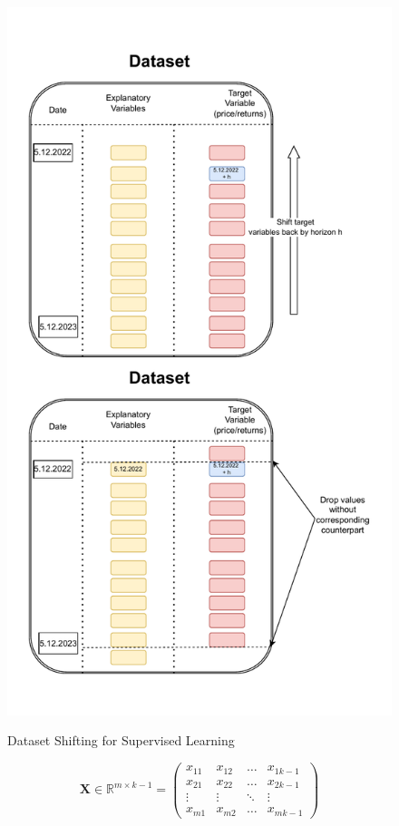 \begin{figure}[!h]
    \centering
    \caption{Dataset Shifting for Supervised Learning}
        \includegraphics[width=1\textwidth]{Figures/data_shift.drawio.pdf}
    \label{fig:dataset_shift}
\end{figure}

\begin{equation}\label{eq:explanatory}
    \mathbf{X} \in \mathbb{R}^{m \times {k-1}} = 
    \begin{pmatrix}
        x_{11} & x_{12} & \dots  & x_{1k-1} \\
        x_{21} & x_{22} & \dots  & x_{2k-1} \\
        \vdots & \vdots & \ddots & \vdots \\
        x_{m1} & x_{m2} & \dots  & x_{mk-1}
    \end{pmatrix}
\end{equation}

